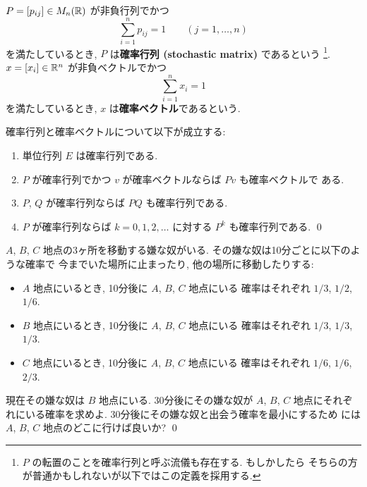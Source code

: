 \documentclass[12pt,twoside]{jarticle}
\begin{document}
$P=[p_{ij}]\in M_n({\mathbb R})$ が非負行列でかつ
\begin{equation*}
  \sum_{i=1}^n p_{ij} = 1  \qquad (j=1,\ldots,n)
\end{equation*}
を満たしているとき, $P$ は{\bf 確率行列 (stochastic matrix)} であるという%
\footnote{$P$ の転置のことを確率行列と呼ぶ流儀も存在する. もしかしたら
  そちらの方が普通かもしれないが以下ではこの定義を採用する.}.
$x=[x_i]\in{\mathbb R}^n$ が非負ベクトルでかつ 
\begin{equation*}
  \sum_{i=1}^n x_i = 1
\end{equation*}
を満たしているとき, $x$ は{\bf 確率ベクトル}であるという.

\begin{question}
  確率行列と確率ベクトルについて以下が成立する:
  \begin{enumerate}
  \item 単位行列 $E$ は確率行列である.
  \item $P$ が確率行列でかつ $v$ が確率ベクトルならば $Pv$ も確率ベクトルで
    ある.
  \item $P$, $Q$ が確率行列ならば $PQ$ も確率行列である.
  \item $P$ が確率行列ならば $k=0,1,2,\ldots$ に対する $P^k$ も確率行列である.
  \qed
  \end{enumerate}
\end{question}

\begin{question}
  \label{q:iyanayatsu}
  $A$, $B$, $C$ 地点の3ヶ所を移動する嫌な奴がいる.
  その嫌な奴は10分ごとに以下のような確率で
  今までいた場所に止まったり, 他の場所に移動したりする:
  \begin{itemize}
  \item $A$ 地点にいるとき, 10分後に $A$, $B$, $C$ 地点にいる
    確率はそれぞれ $1/3$, $1/2$, $1/6$.
  \item $B$ 地点にいるとき, 10分後に $A$, $B$, $C$ 地点にいる
    確率はそれぞれ $1/3$, $1/3$, $1/3$.
  \item $C$ 地点にいるとき, 10分後に $A$, $B$, $C$ 地点にいる
    確率はそれぞれ $1/6$, $1/6$, $2/3$.
  \end{itemize}
  現在その嫌な奴は $B$ 地点にいる. 
  30分後にその嫌な奴が $A$, $B$, $C$ 地点にそれぞれにいる確率を求めよ.
  30分後にその嫌な奴と出会う確率を最小にするため
  には $A$, $B$, $C$ 地点のどこに行けば良いか?
  \qed
\end{question}
\end{document}
